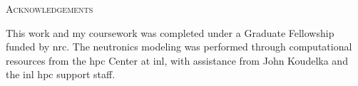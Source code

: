 \begin{center}
   {\LARGE\textsc{Acknowledgements}}

   This work and my coursework was completed under a Graduate Fellowship funded by \acf{nrc}. The neutronics modeling was performed through computational resources from the \acf{hpc} Center at \acf{inl}, with assistance from John Koudelka and the \acs{inl} \acs{hpc} support staff.
   

\end{center}

